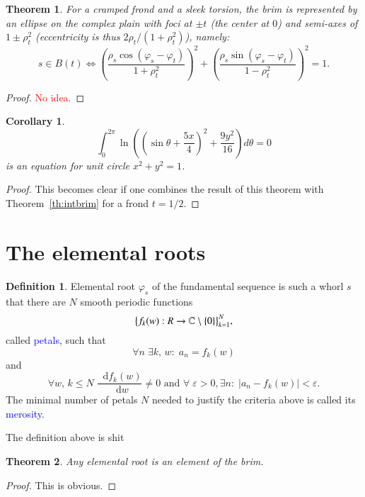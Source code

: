 \documentclass{article}
\newcommand*\df {\mathop{}\!\mathrm{d}}
\newcommand{\red}[1]{\textcolor{red}{#1}}
\newcommand{\blue}[1]{\textcolor{blue}{#1}}
\theoremstyle{plain}
\newtheorem{theorem}{Theorem}[section]
\newtheorem{corollary}{Corollary}[theorem]
\theoremstyle{definition}
\newtheorem{definition}{Definition}[section]
\newcommand{\cmz}{\mathbb C \setminus \{0\} }
\begin{document}
    \begin{theorem}
        For a cramped frond and a sleek torsion, the brim is represented by an ellipse on the complex plain with foci at $\pm t$ (the center at $0$) and semi-axes of $1\pm\rho_t^2$ (eccentricity is thus $2\rho_t/(1+\rho_t^2)$), namely:
        $$
            s \in B(t) \Leftrightarrow \left(\frac{\rho_s\cos(\varphi_s-\varphi_t)}{1+\rho_t^2}\right)^2 + \left(\frac{\rho_s\sin(\varphi_s-\varphi_t)}{1-\rho_t^2}\right)^2 = 1 
        .$$
    \end{theorem}
    \begin{proof}
        \red{No idea.}
    \end{proof}

    \begin{corollary}
        $$
            \int_0^{2\pi} \ln\left(\left(\sin\theta+\frac{5x}4\right)^2+\frac{9y^2}{16}\right)d\theta = 0  
        $$ is an equation for unit circle $x^2+y^2=1$.

    \end{corollary}

    \begin{proof}
        This becomes clear if one combines the result of this theorem with Theorem~\ref{th:intbrim} for a frond $t=1/2$.  
    \end{proof}

\section{The elemental roots}
    \begin{definition}
        Elemental root $\varphi_s$ of the fundamental sequence is such a whorl $s$ that there are $N$ smooth periodic functions 
        $$ 
            \big\{f_k(w): \mathbb \mathbb R \rightarrow \cmz\big\}_{k=1}^N 
        ,$$ called \blue{petals}, such that $$
            \forall n %
            \; \exists k %
            ,\,w %
            :\; a_n = f_k(w) 
        $$ and $$
            \forall w,\,k\le N\; \frac{\df{f_k(w)}}{\df{w}}\ne 0 \text{ and } \forall \;\varepsilon >0, \exists n :\; |a_n - f_k(w)|<\varepsilon
        .$$
        The minimal number of petals $N$ needed to justify the criteria above is called its \blue{merosity}.  	
    \end{definition} 
    The definition above is shit
    \begin{theorem}
        Any elemental root is an element of the brim.
    \end{theorem}
    \begin{proof}
        This is obvious.
    \end{proof}
\end{document}
